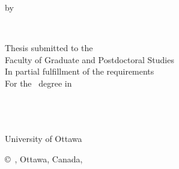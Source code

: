 \pagestyle{empty}

\begin{titlepage}
        \begin{center}
        \vspace*{1.0cm}

        \Huge
        {\bf \thesistitlecoverpage }

        \vspace*{1.0cm}

        \normalsize
        by \\

        \vspace*{1.0cm}

        \Large
        \thesisauthor \\

        \vspace*{3.0cm}

        \normalsize
        Thesis submitted to the\\
        Faculty of Graduate and Postdoctoral Studies\\
        In partial fulfillment of the requirements\\
        For the \degree~degree in\\
        \nameofprogram\\

        \vspace*{2.0cm}

        \academicunit\\
        \faculty\\
        University of Ottawa\\

        \vspace*{1.0cm}

        \copyright~\thesisauthor, Ottawa, Canada, \graduationyear\\
        \end{center}
\end{titlepage}

\pagestyle{plain}
\setcounter{page}{2}

\cleardoublepage %

